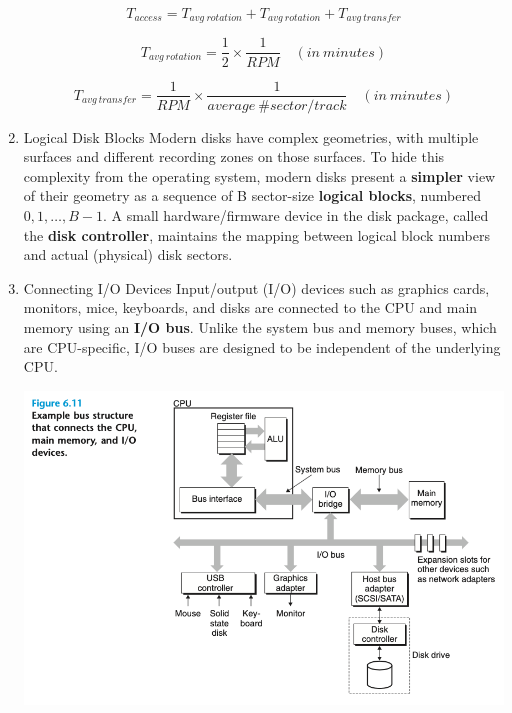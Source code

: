 \documentclass[11pt]{article}
\begin{document}
\begin{enumerate}
\begin{equation}
T_{access} = T_{avg\ rotation} + T_{avg\ rotation} + T_{avg\ transfer}
\end{equation}

\begin{equation}
T_{avg\ rotation} = \frac{1}{2} \times \frac{1}{RPM} \quad (in\ minutes)
\end{equation}

\begin{equation}
T_{avg\ transfer} = \frac{1}{RPM} \times \frac{1}{average\ \#sector/track} \quad (in\ minutes)
\end{equation}


\item Logical Disk Blocks
\label{sec:orgcaa38fd}
Modern disks have complex geometries, with multiple surfaces and different recording zones on those surfaces. To hide this complexity from the operating system, modern disks present a \textbf{simpler} view of their geometry as a sequence of B sector-size \textbf{logical blocks}, numbered \(0, 1, \dots , B − 1\). A small hardware/firmware device in the disk package, called the \textbf{disk controller}, maintains the mapping between logical block numbers and actual (physical) disk sectors.\\

\item Connecting I/O Devices
\label{sec:org069ba39}
Input/output (I/O) devices such as graphics cards, monitors, mice, keyboards, and disks are connected to the CPU and main memory using an \textbf{I/O bus}. Unlike the system bus and memory buses, which are CPU-specific, I/O buses are designed to be independent of the underlying CPU.\\

\begin{center}
\includegraphics[width=.9\linewidth]{pics/figure6.11-io-bus.png}
\end{center}


\end{enumerate}
\end{document}
